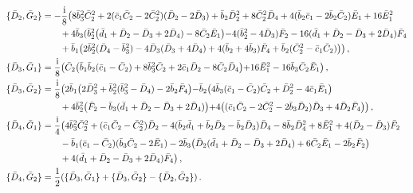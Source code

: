 \documentclass[10pt]{amsart}
\theoremstyle{definition}
\theoremstyle{corollary}
\theoremstyle{remark}
\theoremstyle{conclusion}
\begin{document}
\begin{align}
\{\bar{D}_2, \bar{G}_2\}&=-\frac{{\rm i}}{8}\bigl(8 \bar{b}_3^2 \bar{C}_2^2+2 (\bar{c}_1 \bar{C}_2-2\bar{C}_2^2)(\bar{D}_2-2\bar{D}_3)+\bar{b}_2 \bar{D}_2^2 +8 \bar{C}_2^2 \bar{D}_4+4(\bar{b}_2\bar{c}_1-2\bar{b}_2\bar{C}_2)\bar{E}_1+16 \bar{E}_1^2\nonumber\\
&\hskip 0.7cm +4 \bar{b}_3(\bar{b}_2^2\bigl(\bar{d}_1+\bar{D}_2-\bar{D}_3+2\bar{D}_4)-8 \bar{C}_2 \bar{E}_1\bigl)-4 (\bar{b}_2^2-4\bar{D}_3)\bar{F}_2-16(\bar{d}_1+\bar{D}_2-\bar{D}_3+2\bar{D}_4)\bar{F}_4\nonumber\\
& \hskip 0.7cm +\bar{b}_1\bigl(2 \bar{b}_2^2(\bar{D}_4-\bar{b}_3^2)-4 \bar{D}_3(\bar{D}_3+4\bar{D}_4)+4(\bar{b}_2+4\bar{b}_3)\bar{F}_4+\bar{b}_2(\bar{C}_2^2-\bar{c}_1 \bar{C}_2) \bigl)\bigl) \, , \nonumber\\
\{\bar{D}_3, \bar{G}_1\}&=\frac{{\rm i}}{8}\bigl(\bar{C}_2\bigl(\bar{b}_1 \bar{b}_2(\bar{c}_1-\bar{C}_2)+8 \bar{b}_3^2 \bar{C}_2+2\bar{c}_1\bar{D}_2-8\bar{C}_2 \bar{D}_4\bigl)+16 \bar{E}_1^2-16\bar{b}_3 \bar{C}_2 \bar{E}_1\bigl) \, , \nonumber\\
\{\bar{D}_3, \bar{G}_2\}&=\frac{{\rm i}}{8}\bigl(2 \bar{b}_1\bigl(2 \bar{D}_3^2+\bar{b}_2^2(\bar{b}_3^2-\bar{D}_4)-2\bar{b}_2\bar{F}_4\bigl)-\bar{b}_2\bigl(4 \bar{b}_3(\bar{c}_1-\bar{C}_2)\bar{C}_2+\bar{D}_2^2-4\bar{c}_1 \bar{E}_1 \bigl) \nonumber\\
& \hskip 0.7cm +4 \bar{b}_2^2\bigl(\bar{F}_2-\bar{b}_3(\bar{d}_1+\bar{D}_2-\bar{D}_3+2\bar{D}_4)\bigl)+4 \bigl( (\bar{c}_1 \bar{C}_2 -2\bar{C}_2^2-2\bar{b}_3\bar{D}_2)\bar{D}_3+4\bar{D}_2\bar{F}_4\bigl)\bigl) \, , \nonumber\\
\{\bar{D}_4, \bar{G}_1\}&=\frac{{\rm i}}{4}\bigl(4 \bar{b}_3^2\bar{C}_2^2+(\bar{c}_1 \bar{C}_2-\bar{C}_2^2)\bar{D}_2-4(\bar{b}_2 \bar{d}_1+\bar{b}_2 \bar{D}_2-\bar{b}_2 \bar{D}_3)\bar{D}_4-8 \bar{b}_2 \bar{D}_4^2 +8 \bar{E}_1^2+4(\bar{D}_2-\bar{D}_3)\bar{F}_2 \nonumber\\
&\hskip 0.7cm -\bar{b}_1(\bar{c}_1-\bar{C}_2)(\bar{b}_3\bar{C}_2-2\bar{E}_1) -2 \bar{b}_3\bigl(\bar{D}_2(\bar{d}_1+\bar{D}_2-\bar{D}_3+2\bar{D}_4)+6\bar{C}_2 \bar{E}_1-2\bar{b}_2 \bar{F}_2 \bigl) \nonumber\\
&\hskip 0.7cm +4(\bar{d}_1+\bar{D}_2-\bar{D}_3+2\bar{D}_4)\bar{F}_4\bigl) \, , \nonumber\\
\{\bar{D}_4, \bar{G}_2\}&= \frac{1}{2}(\{\bar{D}_3,\bar{G}_1\}+\{\bar{D}_3,\bar{G}_2\}-\{\bar{D}_2, \bar{G}_2\})\, .%
\end{align} 
\end{document}
